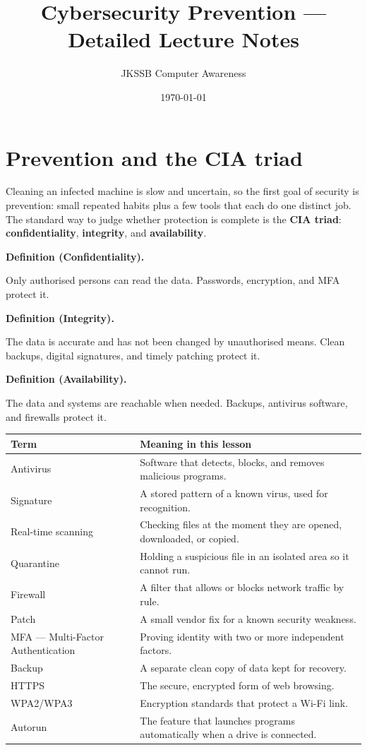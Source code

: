 \documentclass[11pt]{article}
\title{Cybersecurity Prevention --- Detailed Lecture Notes}
\author{JKSSB Computer Awareness}
\date{\today}
\newenvironment{definitionbox}[1]{%
  \par\noindent\textbf{Definition (#1).}\ \itshape
}{\par\vspace{0.3em}}
\begin{document}
\maketitle

\section{Prevention and the CIA triad}
Cleaning an infected machine is slow and uncertain, so the first goal of
security is prevention: small repeated habits plus a few tools that each do
one distinct job. The standard way to judge whether protection is complete is
the \textbf{CIA triad}: \textbf{confidentiality}, \textbf{integrity}, and
\textbf{availability}.

\begin{definitionbox}{Confidentiality}
Only authorised persons can read the data. Passwords, encryption, and MFA
protect it.
\end{definitionbox}

\begin{definitionbox}{Integrity}
The data is accurate and has not been changed by unauthorised means.
Clean backups, digital signatures, and timely patching protect it.
\end{definitionbox}

\begin{definitionbox}{Availability}
The data and systems are reachable when needed. Backups, antivirus software,
and firewalls protect it.
\end{definitionbox}

\begin{center}
\begin{tabular}{p{}p{}}
\toprule
\textbf{Term} & \textbf{Meaning in this lesson} \\
\midrule
Antivirus & Software that detects, blocks, and removes malicious programs. \\
Signature & A stored pattern of a known virus, used for recognition. \\
Real-time scanning & Checking files at the moment they are opened, downloaded, or copied. \\
Quarantine & Holding a suspicious file in an isolated area so it cannot run. \\
Firewall & A filter that allows or blocks network traffic by rule. \\
Patch & A small vendor fix for a known security weakness. \\
MFA --- Multi-Factor Authentication & Proving identity with two or more independent factors. \\
Backup & A separate clean copy of data kept for recovery. \\
HTTPS & The secure, encrypted form of web browsing. \\
WPA2/WPA3 & Encryption standards that protect a Wi-Fi link. \\
Autorun & The feature that launches programs automatically when a drive is connected. \\
\bottomrule
\end{tabular}
\end{center}
\end{document}
